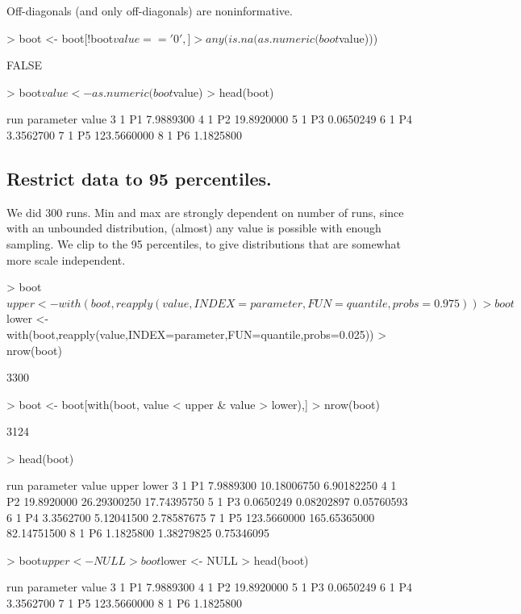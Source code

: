 Off-diagonals (and only off-diagonals) are noninformative.
\begin{Schunk}
\begin{Sinput}
> boot <- boot[!boot$value=='0',]
> any(is.na(as.numeric(boot$value)))
\end{Sinput}
\begin{Soutput}
[1] FALSE
\end{Soutput}
\begin{Sinput}
> boot$value <- as.numeric(boot$value)
> head(boot)
\end{Sinput}
\begin{Soutput}
  run parameter       value
3   1        P1   7.9889300
4   1        P2  19.8920000
5   1        P3   0.0650249
6   1        P4   3.3562700
7   1        P5 123.5660000
8   1        P6   1.1825800
\end{Soutput}
\end{Schunk}
\subsection{Restrict data to 95 percentiles.}
We did 300 runs.  Min and max are strongly dependent on number of runs, since 
with an unbounded distribution, (almost) any value is possible with enough sampling.
We clip to the 95 percentiles, to give distributions that are somewhat more
scale independent.
\begin{Schunk}
\begin{Sinput}
> boot$upper <- with(boot,reapply(value,INDEX=parameter,FUN=quantile,probs=0.975))
> boot$lower <- with(boot,reapply(value,INDEX=parameter,FUN=quantile,probs=0.025))
> nrow(boot)
\end{Sinput}
\begin{Soutput}
[1] 3300
\end{Soutput}
\begin{Sinput}
> boot <- boot[with(boot, value < upper & value > lower),]
> nrow(boot)
\end{Sinput}
\begin{Soutput}
[1] 3124
\end{Soutput}
\begin{Sinput}
> head(boot)
\end{Sinput}
\begin{Soutput}
  run parameter       value        upper       lower
3   1        P1   7.9889300  10.18006750  6.90182250
4   1        P2  19.8920000  26.29300250 17.74395750
5   1        P3   0.0650249   0.08202897  0.05760593
6   1        P4   3.3562700   5.12041500  2.78587675
7   1        P5 123.5660000 165.65365000 82.14751500
8   1        P6   1.1825800   1.38279825  0.75346095
\end{Soutput}
\begin{Sinput}
> boot$upper <- NULL
> boot$lower <- NULL
> head(boot)
\end{Sinput}
\begin{Soutput}
  run parameter       value
3   1        P1   7.9889300
4   1        P2  19.8920000
5   1        P3   0.0650249
6   1        P4   3.3562700
7   1        P5 123.5660000
8   1        P6   1.1825800
\end{Soutput}
\end{Schunk}
